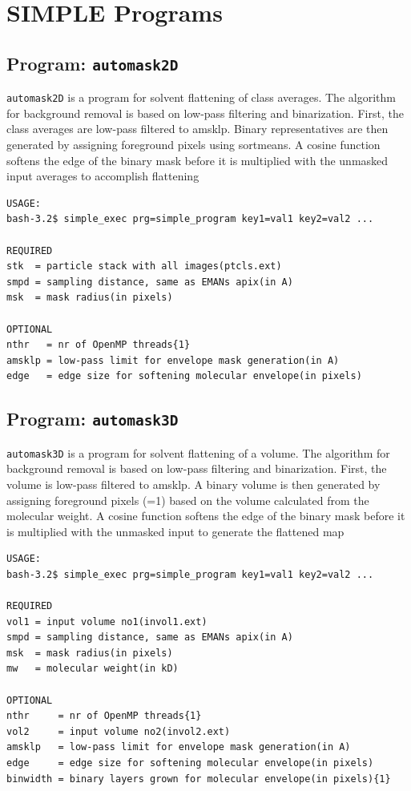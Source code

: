 \documentclass[a4paper,11pt]{article}
\newcommand{\prgname}[1]{\textcolor{NavyBlue}{\texttt{#1}}}
\begin{document}
\section{SIMPLE Programs}
\subsection{Program: \prgname{automask2D}}
\label{automask2D}
\prgname{automask2D} is a program for solvent flattening of class averages. The algorithm for background removal is based on low-pass filtering and binarization. First, the class averages are low-pass filtered to amsklp. Binary representatives are then generated by assigning foreground pixels using sortmeans. A cosine function softens the edge of the binary mask before it is  multiplied with the unmasked input averages to accomplish flattening

\begin{verbatim}
USAGE:
bash-3.2$ simple_exec prg=simple_program key1=val1 key2=val2 ...

REQUIRED
stk  = particle stack with all images(ptcls.ext)
smpd = sampling distance, same as EMANs apix(in A)
msk  = mask radius(in pixels)

OPTIONAL
nthr   = nr of OpenMP threads{1}
amsklp = low-pass limit for envelope mask generation(in A)
edge   = edge size for softening molecular envelope(in pixels)
\end{verbatim}

\subsection{Program: \prgname{automask3D}}
\label{automask3D}
\prgname{automask3D} is a program for solvent flattening of a volume. The algorithm for background removal is based on low-pass filtering and binarization. First, the volume is low-pass filtered to amsklp. A binary volume is then generated by assigning foreground pixels (=1) based on the volume calculated from the molecular weight. A cosine function softens the edge of the binary mask before it is  multiplied with the unmasked input to generate the flattened map 

\begin{verbatim}
USAGE:
bash-3.2$ simple_exec prg=simple_program key1=val1 key2=val2 ...

REQUIRED
vol1 = input volume no1(invol1.ext)
smpd = sampling distance, same as EMANs apix(in A)
msk  = mask radius(in pixels)
mw   = molecular weight(in kD)

OPTIONAL
nthr     = nr of OpenMP threads{1}
vol2     = input volume no2(invol2.ext)
amsklp   = low-pass limit for envelope mask generation(in A)
edge     = edge size for softening molecular envelope(in pixels)
binwidth = binary layers grown for molecular envelope(in pixels){1}
\end{verbatim}
\end{document}
